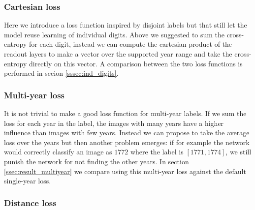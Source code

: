 

\subsubsection{Cartesian loss} \label{sssec:cartesian}

%

Here we introduce a loss function inspired by disjoint labels but that still let the model reuse learning of individual digits. Above we suggested to sum the cross-entropy for each digit, instead we can compute the cartesian product of the readout layers to make a vector over the supported year range and take the cross-entropy directly on this vector. A comparison between the two loss functions is performed in secion \ref{sssec:ind_digits}.


\subsubsection{Multi-year loss} \label{sssec:alt_multiyear}

It is not trivial to make a good loss function for multi-year labels. If we sum the loss for each year in the label, the images with many years have a higher influence than images with few years. Instead we can propose to take the average loss over the years but then another problem emerges: if for example the network would correctly classify an image as $1772$ where the label is $[1771, 1774]$, we still punish the network for not finding the other years.
In section \ref{ssec:result_multiyear} we compare using this multi-year loss against the default single-year loss.

\subsubsection{Distance loss}

